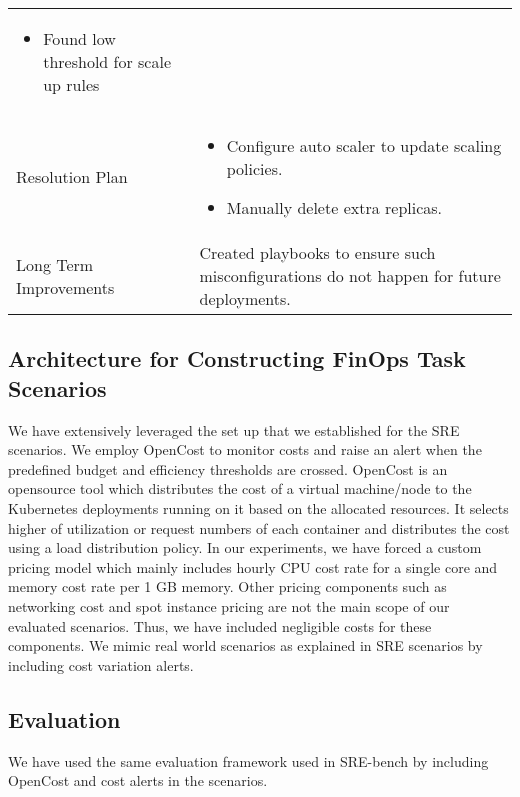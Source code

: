 \begin{table*}[ht!]
\begin{threeparttable}
\begin{tabular}{m{}m{}}
\begin{itemize}[left=0pt, topsep=0pt, partopsep=0pt, itemsep=0pt, parsep=0pt]
                \item Found low threshold for scale up rules
            \end{itemize} \\
            Resolution Plan & \begin{itemize}[left=0pt, topsep=0pt, partopsep=0pt, itemsep=0pt, parsep=0pt]
                \item Configure auto scaler to update scaling policies.
                \item Manually delete extra replicas.
            \end{itemize} \\ 
            Long Term Improvements & Created playbooks to ensure such misconfigurations do not happen for future deployments. \\
            \bottomrule
        \end{tabular}
    \end{threeparttable}
\end{table*}



\subsection{\bench Architecture for Constructing FinOps Task Scenarios}
\label{ss:finops-bench}
We have extensively leveraged the set up that we established for the SRE scenarios. We employ OpenCost to monitor costs and raise an alert when the predefined budget and efficiency thresholds are crossed. 
OpenCost is an opensource tool which distributes the cost of a virtual machine/node to the Kubernetes deployments running on it based on the allocated resources. It selects higher of utilization or request numbers of each container and distributes the cost using a load distribution policy. 
In our experiments, we have forced a custom pricing model which mainly includes hourly CPU cost rate for a single core and memory cost rate per 1 GB memory. Other pricing components such as networking cost and spot instance pricing are not the main scope of our evaluated scenarios. Thus, we have included negligible costs for these components. 
We mimic real world scenarios as explained in SRE scenarios by including cost variation alerts. 





\subsection{Evaluation}
We have used the same evaluation framework used in SRE-bench by including OpenCost and cost alerts in the scenarios. 

